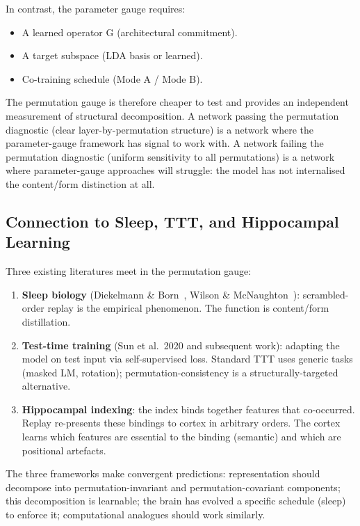 \documentclass[11pt, a4paper]{article}
\theoremstyle{plain}
\theoremstyle{definition}
\theoremstyle{remark}
\begin{document}
In contrast, the parameter gauge requires:
\begin{itemize}[nosep]
\item A learned operator G (architectural commitment).
\item A target subspace (LDA basis or learned).
\item Co-training schedule (Mode A / Mode B).
\end{itemize}

The permutation gauge is therefore cheaper to test and provides an independent measurement of structural decomposition.
A network passing the permutation diagnostic (clear layer-by-permutation structure) is a network where the parameter-gauge framework has signal to work with.
A network failing the permutation diagnostic (uniform sensitivity to all permutations) is a network where parameter-gauge approaches will struggle: the model has not internalised the content/form distinction at all.

\subsection{Connection to Sleep, TTT, and Hippocampal Learning}

Three existing literatures meet in the permutation gauge:

\begin{enumerate}[nosep]
\item \textbf{Sleep biology} (Diekelmann \& Born~\cite{diekelmann2010sleep}, Wilson \& McNaughton~\cite{wilson1994reactivation}): scrambled-order replay is the empirical phenomenon. The function is content/form distillation.
\item \textbf{Test-time training} (Sun et al.\ 2020 and subsequent work): adapting the model on test input via self-supervised loss. Standard TTT uses generic tasks (masked LM, rotation); permutation-consistency is a structurally-targeted alternative.
\item \textbf{Hippocampal indexing}: the index binds together features that co-occurred. Replay re-presents these bindings to cortex in arbitrary orders. The cortex learns which features are essential to the binding (semantic) and which are positional artefacts.
\end{enumerate}

The three frameworks make convergent predictions: representation should decompose into permutation-invariant and permutation-covariant components; this decomposition is learnable; the brain has evolved a specific schedule (sleep) to enforce it; computational analogues should work similarly.
\end{document}
